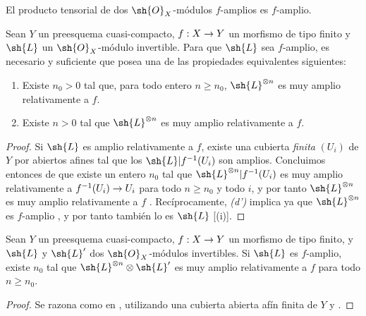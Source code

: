 \documentclass[oneside,10pt]{amsart}
\makeatletter
\renewcommand{\geq}{\geqslant}
\newcommand{\ega@arrow}[2]{\mathchoice{#1}{#2}{#2}{#2}}
\renewcommand{\to}{\ega@arrow{\longrightarrow}{\rightarrow}}
\let\EGAOriginalLabel\label
\renewcommand{\label}[1]{\phantomsection\EGAOriginalLabel{#1}}
\makeatother
\begin{document}
\begin{corollary}[4.6.10]
\label{II.4.6.10}
El producto tensorial de dos $\sh{O}_X$-módulos $f$-amplios es $f$-amplio.
\end{corollary}

\begin{proposition}[4.6.11]
\label{II.4.6.11}
Sean $Y$ un preesquema cuasi-compacto, $f:X\to Y$ un morfismo de tipo finito y $\sh{L}$ un $\sh{O}_X$-módulo invertible.
Para que $\sh{L}$ sea $f$-amplio, es necesario y suficiente que posea una de las propiedades equivalentes siguientes:
\begin{enumerate}
  \item[\rm{(d)}] Existe $n_0>0$ tal que, para todo entero $n\geq n_0$, $\sh{L}^{\otimes n}$ es muy amplio relativamente a $f$.
  \item[\rm{(d')}] Existe $n>0$ tal que $\sh{L}^{\otimes n}$ es muy amplio relativamente a $f$.
\end{enumerate}
\end{proposition}

\begin{proof}
Si $\sh{L}$ es amplio relativamente a $f$, existe una cubierta \emph{finita} $(U_i)$ de $Y$ por abiertos afines tal que los $\sh{L}|f^{-1}(U_i)$ son amplios.
Concluimos entonces de  que existe un entero $n_0$ tal que $\sh{L}^{\otimes n}|f^{-1}(U_i)$ es muy amplio relativamente a $f^{-1}(U_i)\to U_i$ para todo $n\geq n_0$ y todo $i$, y por tanto $\sh{L}^{\otimes n}$ es muy amplio relativamente a $f$ .
Recíprocamente, \emph{(d')} implica ya que $\sh{L}^{\otimes n}$ es $f$-amplio , y por tanto también lo es $\sh{L}$ [(i)].
\end{proof}

\begin{corollary}[4.6.12]
\label{II.4.6.12}
Sean $Y$ un preesquema cuasi-compacto, $f:X\to Y$ un morfismo de tipo finito, y $\sh{L}$ y $\sh{L}'$ dos $\sh{O}_X$-módulos invertibles.
Si $\sh{L}$ es $f$-amplio, existe $n_0$ tal que $\sh{L}^{\otimes n}\otimes\sh{L}'$ es muy amplio relativamente a $f$ para todo $n\geq n_0$.
\end{corollary}

\begin{proof}
Se razona como en , utilizando una cubierta abierta afín finita de $Y$ y .
\end{proof}
\end{document}
